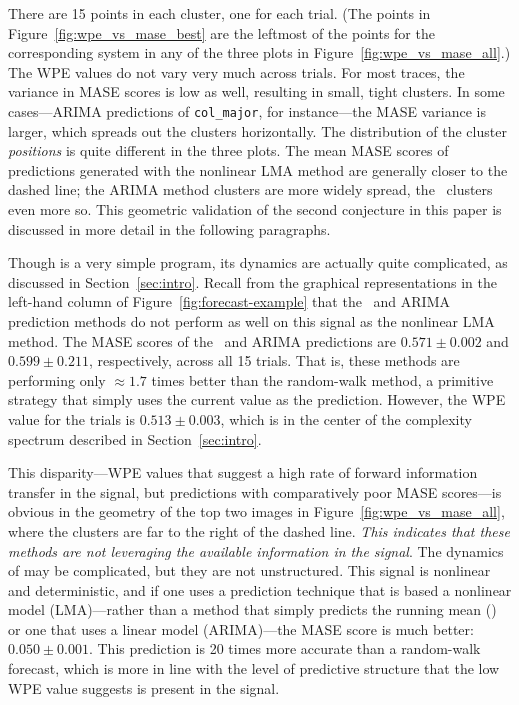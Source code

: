 There are 15 points in each cluster, one for each trial.  (The points
in Figure~\ref{fig:wpe_vs_mase_best} are the leftmost of the points
for the corresponding system in any of the three plots in
Figure~\ref{fig:wpe_vs_mase_all}.)  The WPE values do not vary very
much across trials.  For most traces, the variance in MASE scores is
low as well, resulting in small, tight clusters.  In some
cases---ARIMA predictions of {\tt col\_major}, for instance---the MASE
variance is larger, which spreads out the clusters horizontally.  The
distribution of the cluster \emph{positions} is quite different in the
three plots.  The mean MASE scores of predictions generated with the
nonlinear LMA method are generally closer to the dashed line; the
ARIMA method clusters are more widely spread, the \naive ~clusters
even more so.  This geometric validation of the second conjecture in
this paper is discussed in more detail in the following paragraphs.

Though \col is a very simple program, its dynamics are actually quite
complicated, as discussed in Section~\ref{sec:intro}.  Recall from the
graphical representations in the left-hand column of
Figure~\ref{fig:forecast-example} that the \naive ~and ARIMA
prediction methods do not perform as well on this signal as the
nonlinear LMA method.  The MASE scores of the \naive ~and ARIMA
predictions are $0.571 \pm 0.002$ and $0.599 \pm 0.211$, respectively,
across all 15 trials.  That is, these methods are performing only
$\approx 1.7$ times better than the random-walk method, a primitive
strategy that simply uses the current value as the prediction.
However, the WPE value for the \col trials is $0.513 \pm 0.003$, which
is in the center of the complexity spectrum described in
Section~\ref{sec:intro}.

This disparity---WPE values that suggest a high rate of forward
information transfer in the signal, but predictions with comparatively
poor MASE scores---is obvious in the geometry of the top two images
in Figure~\ref{fig:wpe_vs_mase_all}, where the \col clusters are far
to the right of the dashed line.  \emph{This indicates that these
  methods are not leveraging the available information in the signal}.
The dynamics of \col may be complicated, but they are not
unstructured.  This signal is nonlinear and deterministic\cite{mytkowicz09}, and if one
uses a prediction technique that is based a nonlinear model
(LMA)---rather than a method that simply predicts the running mean
(\naive) or one that uses a linear model (ARIMA)---the MASE score is
much better: $0.050 \pm 0.001$.  This prediction is 20 times more
accurate than a random-walk forecast, which is more in line with the
level of predictive structure that the low WPE value suggests is
present in the signal.


